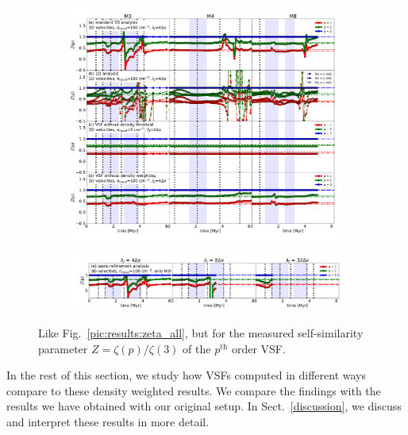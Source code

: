 \documentclass{aa}		%
\begin{document}
\begin{figure}[!htb]
	\centering  
  
  \begin{subfigure}[c]{\textwidth}
      \includegraphics[width=\textwidth]{z_all_nojeans.pdf}
      \label{pic:results:z_all_nojeans}
  \end{subfigure}
  
  \begin{subfigure}[c]{\textwidth}
      \addtocounter{subfigure}{4}
      \includegraphics[width=\textwidth]{z_jeans.pdf}
      \label{pic:results:z_all_jeans}
  \end{subfigure}
  
  \caption{Like Fig.~\ref{pic:results:zeta_all}, but for the measured self-similarity parameter $Z = \zeta(p) / \zeta(3)$ of the $p^\mathrm{th}$ order VSF.}
	\label{pic:results:z_all}
\end{figure}

In the rest of this section, we study how VSFs computed in different ways compare to these density weighted results.
We compare the findings with the results we have obtained with our original setup.
In Sect.~\ref{discussion}, we discuss and interpret these results in more detail.
\end{document}
